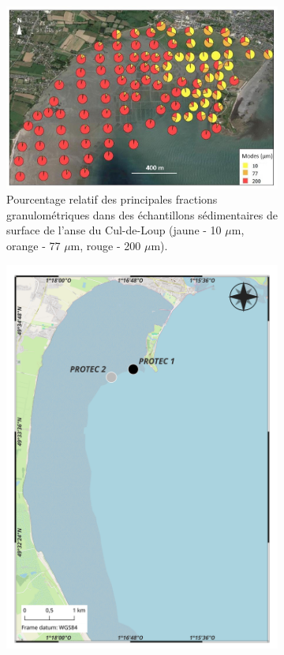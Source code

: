\documentclass[10pt,a4paper,titlepage]{article}
\begin{document}
\begin{figure}[!h]
    \centering
    \begin{subfigure}{0.55\linewidth}
        \centering
\includegraphics[width=1\linewidth]{../images/sed_adcl_protec.png}
        \caption[Couverture sédimentaire de l'anse du Cul-de-Loup]{Pourcentage relatif des principales fractions granulométriques dans des échantillons sédimentaires de surface de l'anse du Cul-de-Loup (jaune - 10 $\mu$m, orange - 77 $\mu$m, rouge - 200 $\mu$m).}
        \label{fig:sed_adcl_a}
    \end{subfigure}
    \begin{subfigure}{0.35\linewidth}
        \centering
    \includegraphics[width=1\linewidth]{../images/ADCL_5_localisation_PROTEC_QGIS.png}

\end{subfigure}
\end{figure}
\end{document}
